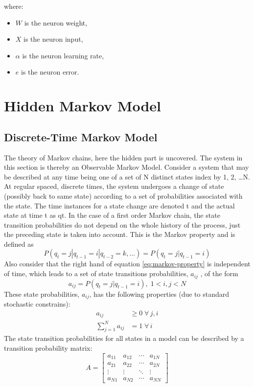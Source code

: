\documentclass[12pt, a4paper, twoside]{report}
\begin{document}
where:
\begin{itemize}[noitemsep]
\item $W$ is the neuron weight,
\item $X$ is the neuron input,
\item $\alpha$ is the neuron learning rate,
\item $e$ is the neuron error.
\end{itemize}

\section{Hidden Markov Model}
\subsection{Discrete-Time Markov Model}
The theory of Markov chains, here the hidden part is uncovered. The system in this section is thereby an Observable Markov Model. Consider a system that may be described at any time being one of a set of N distinct states index by 1, 2, …N. At regular spaced, discrete times, the system undergoes a change of state (possibly back to same state) according to a set of probabilities associated with the state. The time instances for a state change are denoted t and the actual state at time t as qt. In the case of a first order Markov chain, the state transition probabilities do not depend on the whole history of the process, just the preceding state is taken into account. This is the Markov property and is defined as
\begin{equation}
P(q_{t}=j|q_{t-1}=i|q_{t-2}=k,...)=P(q_{t}=j|q_{t-1}=i)
\label{eq:markov-property}
\end{equation}
Also consider that the right hand of equation \ref{eq:markov-property} is independent of time, which leads to a set of state transitions probabilities, $a_{ij}$ , of the form
\begin{equation}
a_{ij}=P(q_{t}=j|q_{t-1}=i),\; 1<i,j<N
\end{equation}
These state probabilities, $a_{ij}$, has the following properties (due to standard stochastic constrains):
\begin{align}
a_{ij} &\geq 0 \; \forall \, j,i\\ 
\sum_{j=1}^{N} a_{ij} &= 1 \; \forall \, i
\end{align}
The state transition probabilities for all states in a model can be described by a transition probability matrix:
\begin{equation}
A = \begin{bmatrix}
a_{11} & a_{12} & \cdots & a_{1N} \\ 
a_{21} & a_{22} & \cdots & a_{2N}\\ 
\vdots & \vdots & \ddots & \vdots \\ 
a_{N1} & a_{N2} & \cdots & a_{NN}
\end{bmatrix}
\end{equation}
\end{document}
